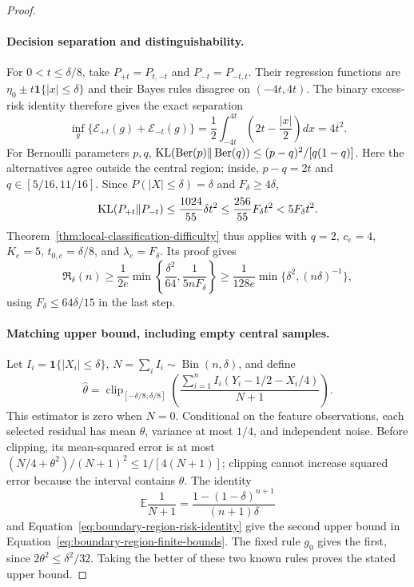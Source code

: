 \begin{proof}
\paragraph{Decision separation and distinguishability.}
For $0<t\le\delta/8$, take $P_{+t}=P_{t,-t}$ and $P_{-t}=P_{-t,t}$. Their regression functions are $\eta_0\pm t\mathbf1\{|x|\le\delta\}$ and their Bayes rules disagree on $(-4t,4t)$. The binary excess-risk identity therefore gives the exact separation
\begin{equation}
\inf_g\{\mathcal E_{+t}(g)+\mathcal E_{-t}(g)\}
=\frac12\int_{-4t}^{4t}\left(2t-\frac{|x|}{2}\right)dx
=4t^2.
\label{eq:boundary-region-separation}
\end{equation}
For Bernoulli parameters $p,q$, $\operatorname{KL}(\operatorname{Ber}(p)\Vert\operatorname{Ber}(q))\le(p-q)^2/[q(1-q)]$. Here the alternatives agree outside the central region; inside, $p-q=2t$ and $q\in[5/16,11/16]$. Since $P(|X|\le\delta)=\delta$ and $F_\delta\ge4\delta$,
\begin{equation}
\operatorname{KL}(P_{+t}\Vert P_{-t})
\le\frac{1024}{55}\delta t^2
\le\frac{256}{55}F_\delta t^2
<5F_\delta t^2.
\label{eq:boundary-region-kl}
\end{equation}
Theorem~\ref{thm:local-classification-difficulty} thus applies with $q=2$, $c_e=4$, $K_e=5$, $t_{0,e}=\delta/8$, and $\lambda_e=F_\delta$. Its proof gives
\[
\mathfrak R_\delta(n)\ge\frac1{2e}
\min\left\{\frac{\delta^2}{64},\frac1{5nF_\delta}\right\}
\ge\frac1{128e}\min\{\delta^2,(n\delta)^{-1}\},
\]
using $F_\delta\le64\delta/15$ in the last step.

\paragraph{Matching upper bound, including empty central samples.}
Let $I_i=\mathbf1\{|X_i|\le\delta\}$, $N=\sum_i I_i\sim\operatorname{Bin}(n,\delta)$, and define
\begin{equation}
\widehat\theta=\operatorname{clip}_{[-\delta/8,\delta/8]}
\left(\frac{\sum_{i=1}^nI_i(Y_i-1/2-X_i/4)}{N+1}\right).
\label{eq:boundary-region-estimator}
\end{equation}
This estimator is zero when $N=0$. Conditional on the feature observations, each selected residual has mean $\theta$, variance at most $1/4$, and independent noise. Before clipping, its mean-squared error is at most $(N/4+\theta^2)/(N+1)^2\le1/[4(N+1)]$; clipping cannot increase squared error because the interval contains $\theta$. The identity
\[
\mathbb E\frac1{N+1}
=\frac{1-(1-\delta)^{n+1}}{(n+1)\delta}
\]
and Equation~\eqref{eq:boundary-region-risk-identity} give the second upper bound in Equation~\eqref{eq:boundary-region-finite-bounds}. The fixed rule $g_0$ gives the first, since $2\theta^2\le\delta^2/32$. Taking the better of these two known rules proves the stated upper bound.
\end{proof}

